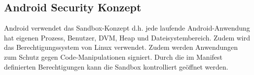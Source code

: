 \subsection{Android Security Konzept}

Android verwendet das Sandbox-Konzept d.h. jede laufende Android-Anwendung hat eigenen Prozess, Benutzer, DVM, Heap und Dateisystembereich. Zudem wird das Berechtigungssystem von Linux verwendet. Zudem werden Anwendungen zum Schutz gegen Code-Manipulationen signiert. Durch die im Manifest definierten Berechtigungen kann die Sandbox kontrolliert geöffnet werden.